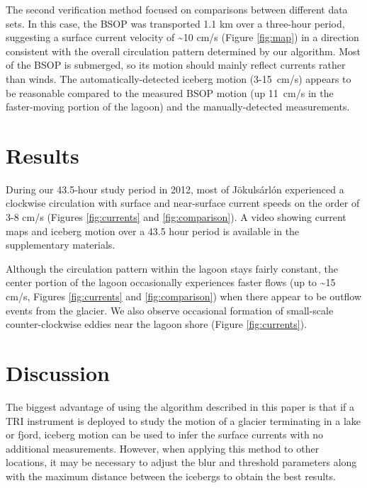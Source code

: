 The second verification method focused on comparisons between different data sets. In this case, the BSOP was transported 1.1 km over a three-hour period, suggesting a surface  current velocity of \textasciitilde 10 cm/s (Figure \ref{fig:map}) in a direction consistent with the overall circulation pattern determined by our algorithm.  Most of the BSOP is submerged, so its motion should mainly reflect currents rather than winds. The automatically-detected iceberg motion (3-15~cm/s) appears to be reasonable compared to the measured BSOP motion (up 11~cm/s in the faster-moving portion of the lagoon) and the manually-detected measurements.





\section{Results}
During our 43.5-hour study period in 2012, most of Jökulsárlón experienced a clockwise circulation with surface and near-surface current speeds on the order of 3-8 cm/s (Figures \ref{fig:currents} and \ref{fig:comparison}).  A video showing current maps and iceberg motion over a 43.5 hour period is available in the supplementary materials.  

Although the circulation pattern within the lagoon stays fairly constant, the center portion of the lagoon occasionally experiences faster flows (up to \textasciitilde 15 cm/s, Figures \ref{fig:currents} and \ref{fig:comparison}) when there appear to be outflow events from the glacier.  We also observe occasional formation of small-scale counter-clockwise eddies near the lagoon shore (Figure \ref{fig:currents}). 







\section{Discussion}
The biggest advantage of using the algorithm described in this paper is that if a TRI instrument is deployed to study the motion of a glacier terminating in a lake or fjord, iceberg motion can be used to infer the surface currents with no additional measurements. However, when applying this method to other locations, it may be necessary to adjust the blur and threshold parameters along with the maximum distance between the icebergs to obtain the best results. 

